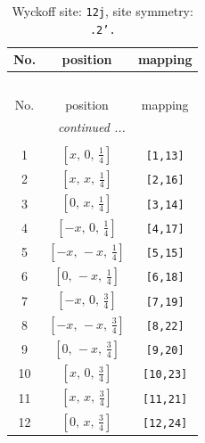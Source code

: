 \documentclass[fleqn,8pt]{jsarticle}
\begin{document}
\begin{longtable}{ccc}
\caption{Wyckoff site: {\tt 12j}, site symmetry: {\tt .2'.}}
 \\
 \hline \hline
No. & position & mapping \\ \hline \endfirsthead

\multicolumn{2}{l}{\tablename\ \thetable{}} \\
 \hline \hline
No. & position & mapping \\ \hline \endhead

 \hline \hline
\multicolumn{2}{r}{\footnotesize\it continued ...} \\ \endfoot

 \hline \hline
\multicolumn{2}{r}{} \\ \endlastfoot

1 & $\left[ x,\, 0,\, \frac{1}{4} \right]$ & {\tt [1,13]} \\ \hline
2 & $\left[ x,\, x,\, \frac{1}{4} \right]$ & {\tt [2,16]} \\ \hline
3 & $\left[ 0,\, x,\, \frac{1}{4} \right]$ & {\tt [3,14]} \\ \hline
4 & $\left[ - x,\, 0,\, \frac{1}{4} \right]$ & {\tt [4,17]} \\ \hline
5 & $\left[ - x,\, - x,\, \frac{1}{4} \right]$ & {\tt [5,15]} \\ \hline
6 & $\left[ 0,\, - x,\, \frac{1}{4} \right]$ & {\tt [6,18]} \\ \hline
7 & $\left[ - x,\, 0,\, \frac{3}{4} \right]$ & {\tt [7,19]} \\ \hline
8 & $\left[ - x,\, - x,\, \frac{3}{4} \right]$ & {\tt [8,22]} \\ \hline
9 & $\left[ 0,\, - x,\, \frac{3}{4} \right]$ & {\tt [9,20]} \\ \hline
10 & $\left[ x,\, 0,\, \frac{3}{4} \right]$ & {\tt [10,23]} \\ \hline
11 & $\left[ x,\, x,\, \frac{3}{4} \right]$ & {\tt [11,21]} \\ \hline
12 & $\left[ 0,\, x,\, \frac{3}{4} \right]$ & {\tt [12,24]} \\
\end{longtable}
\renewcommand{\arraystretch}{1.2}
\end{document}

